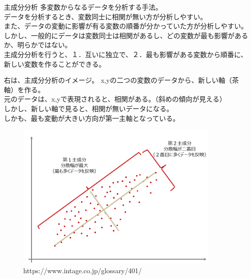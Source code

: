 \documentclass[dvipdfmx,autodetect-engine, unicode, 10pt, aspectratio=169]{beamer}
\begin{document}
\begin{frame}{主成分分析}
    \small
    多変数からなるデータを分析する手法。\\
    データを分析するとき、変数同士に相関が無い方が分析しやすい。  \\
    また、データの変動に影響が有る変数の順番が分かっていた方が分析しやすい。\\
    しかし、一般的にデータは変数同士は相関があるし、どの変数が最も影響があるか、明らかではない。\\
    主成分分析を行うと、１．互いに独立で、２．最も影響がある変数から順番に、新しい変数を作ることができる。

    \begin{minipage}{0.45\linewidth}\scriptsize
        右は、主成分分析のイメージ。
        x,yの二つの変数のデータから、新しい軸（茶軸）を作る。\\
        元のデータは、x,yで表現されると、相関がある。（斜めの傾向が見える）\\
        しかし、新しい軸で見ると、相関が無いデータになる。\\
        しかも、最も変動が大きい方向が第一主軸となっている。
    \end{minipage}
    \begin{minipage}{0.45\linewidth}
        \begin{figure}[h]
        \centering
            \includegraphics[width=0.9\textwidth]{PCA.png}
        \caption*{\tiny https://www.intage.co.jp/glossary/401/}
        \label{fig:mesh1}
        \end{figure}
    \end{minipage}
\end{frame}
\end{document}
